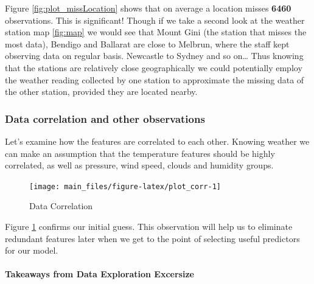 Figure \ref{fig:plot_missLocation} shows that on average a location
misses \textbf{6460} observations. This is significant! Though if we
take a second look at the weather station map \ref{fig:map} we would see
that Mount Gini (the station that misses the most data), Bendigo and
Ballarat are close to Melbrun, where the staff kept observing data on
regular basis. Newcastle to Sydney and so on\ldots{} Thus knowing that
the stations are relatively close geographically we could potentially
employ the weather reading collected by one station to approximate the
missing data of the other station, provided they are located nearby.

\hypertarget{data-correlation-and-other-observations}{%
\subsubsection{Data correlation and other
observations}\label{data-correlation-and-other-observations}}

Let's examine how the features are correlated to each other. Knowing
weather we can make an assumption that the temperature features should
be highly correlated, as well as pressure, wind speed, clouds and
humidity groups.

\begin{Schunk}
\begin{figure}[H]

{\centering \texttt{[image: main\_files/figure-latex/plot\_corr-1]} 

}

\caption[Data Correlation]{Data Correlation}\label{fig:plot_corr}
\end{figure}
\end{Schunk}

Figure \ref{fig:plot_corr} confirms our initial guess. This observation
will help us to eliminate redundant features later when we get to the
point of selecting useful predictors for our model.

\hypertarget{takeaways-from-data-exploration-excersize}{%
\paragraph{Takeaways from Data Exploration
Excersize}\label{takeaways-from-data-exploration-excersize}}

